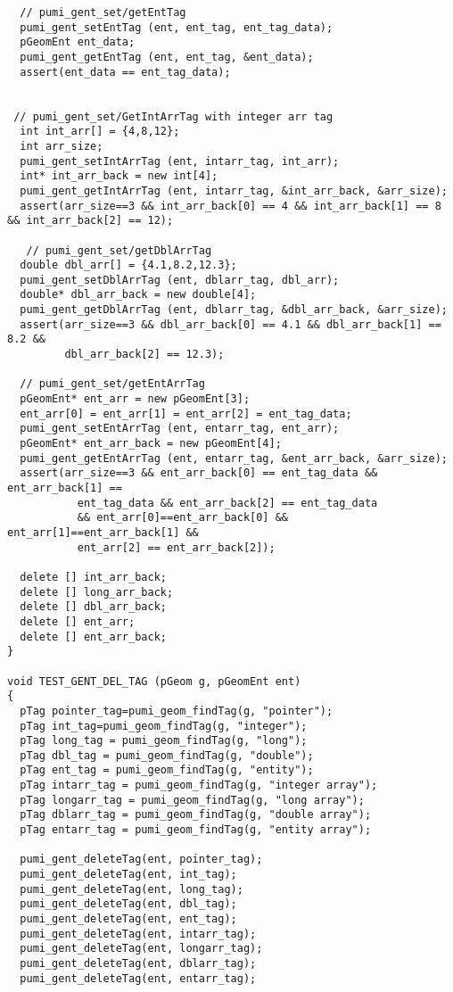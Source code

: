 \begin{small}
\begin{verbatim}
  // pumi_gent_set/getEntTag
  pumi_gent_setEntTag (ent, ent_tag, ent_tag_data);
  pGeomEnt ent_data; 
  pumi_gent_getEntTag (ent, ent_tag, &ent_data);
  assert(ent_data == ent_tag_data);


 // pumi_gent_set/GetIntArrTag with integer arr tag
  int int_arr[] = {4,8,12};
  int arr_size;
  pumi_gent_setIntArrTag (ent, intarr_tag, int_arr);
  int* int_arr_back = new int[4];
  pumi_gent_getIntArrTag (ent, intarr_tag, &int_arr_back, &arr_size);
  assert(arr_size==3 && int_arr_back[0] == 4 && int_arr_back[1] == 8 && int_arr_back[2] == 12);

   // pumi_gent_set/getDblArrTag
  double dbl_arr[] = {4.1,8.2,12.3};
  pumi_gent_setDblArrTag (ent, dblarr_tag, dbl_arr);
  double* dbl_arr_back = new double[4];
  pumi_gent_getDblArrTag (ent, dblarr_tag, &dbl_arr_back, &arr_size);
  assert(arr_size==3 && dbl_arr_back[0] == 4.1 && dbl_arr_back[1] == 8.2 && 
         dbl_arr_back[2] == 12.3);

  // pumi_gent_set/getEntArrTag
  pGeomEnt* ent_arr = new pGeomEnt[3];
  ent_arr[0] = ent_arr[1] = ent_arr[2] = ent_tag_data;
  pumi_gent_setEntArrTag (ent, entarr_tag, ent_arr);
  pGeomEnt* ent_arr_back = new pGeomEnt[4];
  pumi_gent_getEntArrTag (ent, entarr_tag, &ent_arr_back, &arr_size);
  assert(arr_size==3 && ent_arr_back[0] == ent_tag_data && ent_arr_back[1] == 
           ent_tag_data && ent_arr_back[2] == ent_tag_data
           && ent_arr[0]==ent_arr_back[0] && ent_arr[1]==ent_arr_back[1] && 
           ent_arr[2] == ent_arr_back[2]);

  delete [] int_arr_back;
  delete [] long_arr_back;
  delete [] dbl_arr_back;
  delete [] ent_arr;
  delete [] ent_arr_back;
}

void TEST_GENT_DEL_TAG (pGeom g, pGeomEnt ent)
{
  pTag pointer_tag=pumi_geom_findTag(g, "pointer");
  pTag int_tag=pumi_geom_findTag(g, "integer");
  pTag long_tag = pumi_geom_findTag(g, "long");
  pTag dbl_tag = pumi_geom_findTag(g, "double");
  pTag ent_tag = pumi_geom_findTag(g, "entity");
  pTag intarr_tag = pumi_geom_findTag(g, "integer array");
  pTag longarr_tag = pumi_geom_findTag(g, "long array");
  pTag dblarr_tag = pumi_geom_findTag(g, "double array");
  pTag entarr_tag = pumi_geom_findTag(g, "entity array");

  pumi_gent_deleteTag(ent, pointer_tag);
  pumi_gent_deleteTag(ent, int_tag);
  pumi_gent_deleteTag(ent, long_tag);
  pumi_gent_deleteTag(ent, dbl_tag);
  pumi_gent_deleteTag(ent, ent_tag);
  pumi_gent_deleteTag(ent, intarr_tag);
  pumi_gent_deleteTag(ent, longarr_tag);
  pumi_gent_deleteTag(ent, dblarr_tag);
  pumi_gent_deleteTag(ent, entarr_tag);


\end{verbatim}
\end{small}
